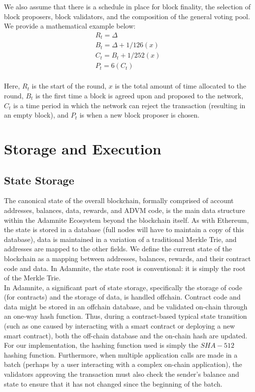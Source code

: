\documentclass[conference]{IEEEtran}
\begin{document}
We also assume that there is a schedule in place for block finality, the selection of block proposers, block validators, and the composition of the general voting pool. We provide a mathematical example below:
\begin{eqnarray}
R_t = \Delta\\
B_t = \Delta + 1/126(x)\\
C_t = B_t + 1/252(x)\\
P_t = 6(C_t)\\
\end{eqnarray}

Here, $R_t$ is the start of the round, $x$ is the total amount of time allocated to the round, $B_t$ is the first time a block is agreed upon and proposed to the network, $C_t$ is a time period in which the network can reject the transaction (resulting in an empty block), and $P_t$ is when a new block proposer is chosen. 



\section{Storage and Execution}

\subsection{State Storage}
The canonical state of the overall blockchain, formally comprised of account addresses, balances, data, rewards, and ADVM code, is the main data structure within the Adamnite Ecosystem beyond the blockchain itself. As with Ethereum, the state is stored in a database (full nodes will have to maintain a copy of this database), data is maintained in a variation of a traditional Merkle Trie, and addresses are mapped to the other fields. We define the current state of the blockchain as a mapping between addresses, balances, rewards, and their contract code and data. In Adamnite, the state root is conventional: it is simply the root of the Merkle Trie. \\

In Adamnite, a significant part of state storage, specifically the storage of code (for contracts) and the storage of data, is handled offchain. Contract code and data might be stored in an offchain database, and be validated on-chain through an one-way hash function. Thus, during a contract-based typical state transition (such as one caused by interacting with a smart contract or deploying a new smart contract), both the off-chain database and the on-chain hash are updated. For our implementation, the hashing function used is simply the $SHA-512$ hashing function. Furthermore, when multiple application calls are made in a batch (perhaps by a user interacting with a complex on-chain application), the validators approving the transaction must also check the sender's balance and state to ensure that it has not changed since the beginning of the batch.\\
\end{document}
